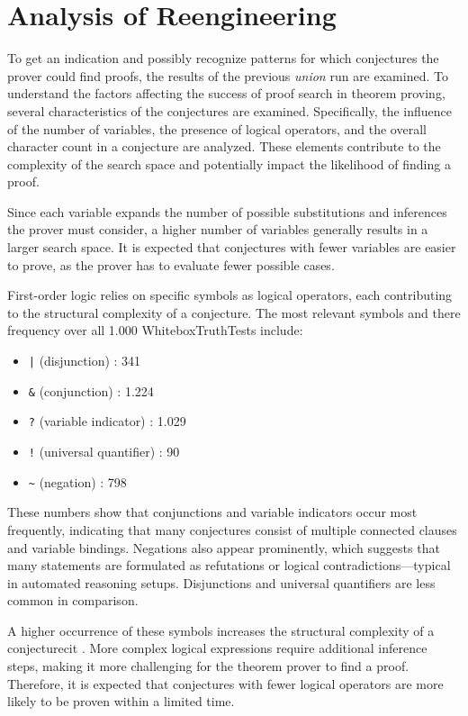 \documentclass[english,version-2020-11]{uzl-thesis}
\begin{document}
\section{Analysis of Reengineering}

To get an indication and possibly recognize patterns for which conjectures the prover could find proofs, the results of the previous \textit{union} run are examined. To understand the factors affecting the success of proof search in theorem proving, several characteristics of the conjectures are examined. Specifically, the influence of the number of variables, the presence of logical operators, and the overall character count in a conjecture are analyzed. These elements contribute to the complexity of the search space and potentially impact the likelihood of finding a proof.

Since each variable expands the number of possible substitutions and inferences the prover must consider, a higher number of variables generally results in a larger search space. It is expected that conjectures with fewer variables are easier to prove, as the prover has to evaluate fewer possible cases.

First-order logic relies on specific symbols as logical operators, each contributing to the structural complexity of a conjecture. The most relevant symbols and there frequency over all 1.000 WhiteboxTruthTests include:
\begin{itemize}
    \item \texttt{|} (disjunction) : 341
    \item \texttt{\&} (conjunction) : 1.224
    \item \texttt{?} (variable indicator) : 1.029
    \item \texttt{!} (universal quantifier) : 90
    \item \texttt{\~{}} (negation) : 798
\end{itemize}

These numbers show that conjunctions and variable indicators occur most frequently, indicating that many conjectures consist of multiple connected clauses and variable bindings. Negations also appear prominently, which suggests that many statements are formulated as refutations or logical contradictions—typical in automated reasoning setups. Disjunctions and universal quantifiers are less common in comparison.


A higher occurrence of these symbols increases the structural complexity of a conjecturecit \cite{Dantsin2001}. More complex logical expressions require additional inference steps, making it more challenging for the theorem prover to find a proof. Therefore, it is expected that conjectures with fewer logical operators are more likely to be proven within a limited time.
\end{document}
